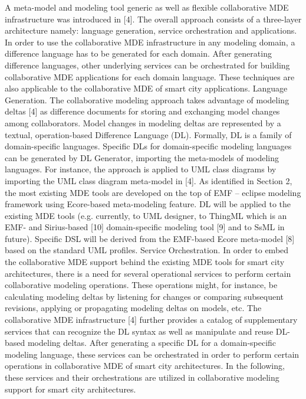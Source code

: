 A meta-model and modeling tool generic as well as flexible collaborative MDE infrastructure was introduced in [4]. The overall approach consists of a three-layer architecture namely: language generation, service orchestration and applications. In order to use the collaborative MDE infrastructure in any modeling domain, a difference language has to be generated for each domain. After generating difference languages, other underlying services can be orchestrated for building collaborative MDE applications for each domain language. These tech­niques are also applicable to the collaborative MDE of smart city applications.
Language Generation. The collaborative modeling approach takes advantage of modeling deltas [4] as difference documents for storing and exchanging model changes among collaborators. Model changes in modeling deltas are represented by a textual, operation-based Difference Language (DL). Formally, DL is a family of domain-specific languages. Specific DLs for domain-specific modeling languages can be generated by DL Generator, importing the meta-models of modeling languages. For instance, the approach is applied to UML class diagrams by importing the UML class diagram meta-model in [4]. 
As identified in Section 2, the most existing MDE tools are developed on the top of EMF – eclipse modeling framework using Ecore-based meta-modeling feature. DL will be applied to the existing MDE tools (e.g. currently, to UML designer, to ThingML which is an EMF- and Sirius-based [10] domain-specific modeling tool [9] and to SsML in future). Specific DSL will be derived from the EMF-based Ecore meta-model [8] based on the standard UML profiles. 
Service Orchestration. In order to embed the collaborative MDE support behind the existing MDE tools for smart city architectures, there is a need for several operational services to perform certain collaborative modeling operations. These operations might, for instance, be calculating modeling deltas by listening for changes or comparing subsequent revisions, applying or propagating modeling deltas on models, etc. The collaborative MDE infrastructure [4] further provides a catalog of supplementary services that can recognize the DL syntax as well as manipulate and reuse DL-based modeling deltas. After generating a specific DL for a domain-specific modeling language, these services can be orchestrated in order to perform certain operations in collaborative MDE of smart city architectures. In the following, these services and their orchestrations are utilized in collaborative modeling support for smart city architectures.

